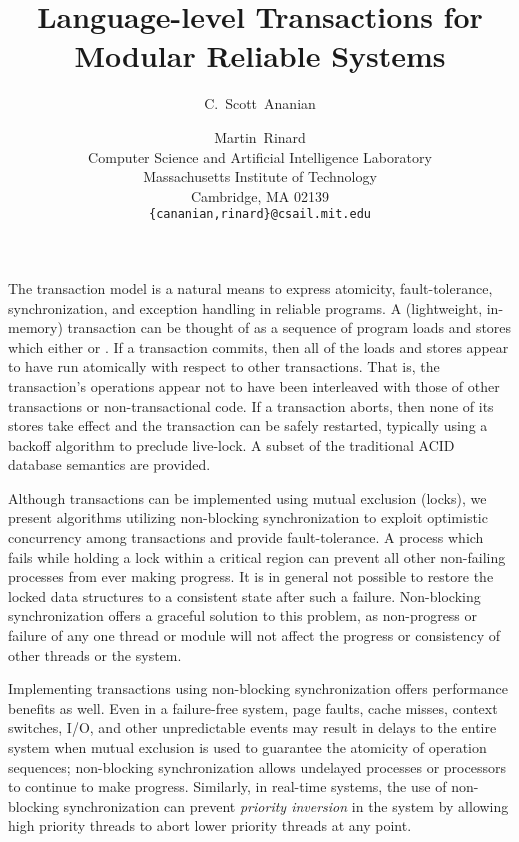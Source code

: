 \documentclass[twoside,twocolumn,notitlepage,letterpaper,9pt]{article}
\title{Language-level Transactions for Modular Reliable Systems}
\author{C.~Scott~Ananian \and Martin~Rinard \\
Computer Science and Artificial Intelligence Laboratory\\
Massachusetts Institute of Technology\\ 
Cambridge, MA 02139 \\
\texttt{\{cananian,rinard\}@csail.mit.edu}
}
\date{}
\begin{document}
\maketitle
{}

The transaction model is a natural means to express atomicity,
fault-tolerance, synchronization, and exception handling in reliable
programs.  A (lightweight, in-memory) transaction can be thought of as
a sequence of program loads and stores which either  or
.  If a transaction commits, then all of the loads and
stores appear to have run atomically with respect to other
transactions.  That is, the transaction's operations appear not to
have been interleaved with those of other transactions or
non-transactional code.  If a transaction aborts, then none of its
stores take effect and the transaction can be safely restarted,
typically using a backoff algorithm to preclude live-lock.
A subset of the traditional ACID database semantics are provided.

Although transactions can be implemented using mutual exclusion
(locks), we present algorithms utilizing non-blocking synchronization
to exploit optimistic concurrency among transactions and provide
fault-tolerance.  A process which fails while holding a lock within a
critical region can prevent all other non-failing processes from ever
making progress.  It is in general not possible to restore the locked
data structures to a consistent state after such a failure.
Non-blocking synchronization offers a graceful solution to this
problem, as non-progress or failure of any one thread or module will
not affect the progress or consistency of other threads or the system.

Implementing transactions using non-blocking synchronization offers
performance benefits as well.  Even in a failure-free system, page
faults, cache misses, context switches, I/O, and other unpredictable
events may result in delays to the entire system when mutual exclusion
is used to guarantee the atomicity of operation sequences;
non-blocking synchronization allows undelayed processes or processors
to continue to make progress.  Similarly, in real-time systems, the
use of non-blocking synchronization can prevent \emph{priority
  inversion} in the system by allowing high priority threads to abort
lower priority threads at any point.
\end{document}
